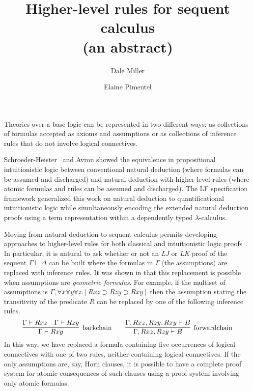 \documentclass[runningheads]{llncs}
\newcommand\proofsystem[1]{\mbox{\slshape #1}\xspace}
\newcommand\LK   {\proofsystem{LK}}
\newcommand\LJ   {\proofsystem{LJ}}
\newcommand{\imp}{\supset}
\newcommand{\twoseq}[2]{#1\vdash #2}
\newcommand{\R}[2]{R #1 #2}
\begin{document}
\title{
       Higher-level rules for sequent calculus\\(an abstract)
}
\author{Dale Miller%
        \and
        Elaine Pimentel%
}

\maketitle              

Theories over a base logic can be represented in two different ways:
as collections of formulas accepted as axioms and assumptions or as
collections of inference rules that do not involve logical
connectives.

Schroeder-Heister~\cite{schroeder-heister84} and Avron
\cite{avron90ndjfl} showed the equivalence in propositional
intuitionistic logic between conventional natural deduction (where
formulas can be assumed and discharged) and natural deduction with
higher-level rules (where atomic formulas and rules can be assumed and
discharged).  The LF \cite{harper93jacm} specification framework
generalized this work on natural deduction to quantificational
intuitionistic logic while simultaneously encoding the extended
natural deduction proofs using a term representation within a
dependently typed $\lambda$-calculus.

Moving from natural deduction to sequent calculus permits developing
approaches to higher-level rules for both classical and intuitionistic
logic proofs~\cite{ciabattoni18tocl,negri03aml}. In particular, it is
natural to ask whether or not an \LJ or \LK proof of the sequent
$\twoseq{\Gamma}{\Delta}$ can be built where the formulas in $\Gamma$
(the assumptions) are replaced with inference rules. It was shown in
\cite{negri03aml} that this replacement is possible when assumptions
are \emph{geometric formulas}. For example, if the multiset of
assumptions is $\Gamma, \forall x\forall y\forall
z.[\R{x}{z}\imp\R{z}{y}\imp\R{x}{y}]$ then the assumption stating the
transitivity of the predicate $R$ can be replaced by one of the
following inference rules.
\[
  \infer[\hbox{backchain}]
        {\twoseq{\Gamma}{\R{x}{y}}}
        {\twoseq{\Gamma}{\R{x}{z}} & \twoseq{\Gamma}{\R{z}{y}}}
  \qquad
  \infer[\hbox{forwardchain}]
        {\twoseq{\Gamma,\R{x}{z},\R{z}{y}}{B}}
        {\twoseq{\Gamma,\R{x}{z},\R{z}{y},\R{x}{y}}{B}}
\]
In this way, we have replaced a formula containing five occurrences of
logical connectives with one of two rules, neither containing logical
connectives. If the only assumptions are, say, Horn clauses, it is
possible to have a complete proof system for atomic consequences of
such clauses using a proof system involving only atomic formulas.
\end{document}
